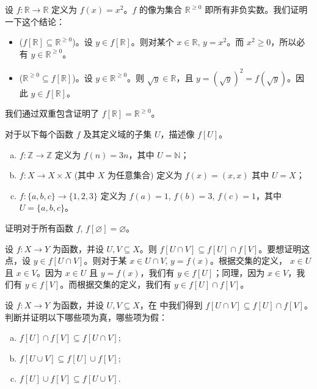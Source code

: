 \begin{example}
设 $f : \mathbb{R} \to \mathbb{R}$ 定义为 $f(x)=x^2$。$f$ 的像为集合 $\mathbb{R}^{\ge 0}$ 即所有非负实数。我们证明一下这个结论：
\begin{itemize}
\item ($f[\mathbb{R}] \subseteq \mathbb{R}^{\ge 0}$)。设 $y \in f[\mathbb{R}]$。则对某个 $x \in \mathbb{R}$, $y=x^2$。而 $x^2 \ge 0$，所以必有 $y \in \mathbb{R}^{\ge 0}$。
\item ($\mathbb{R}^{\ge 0} \subseteq f[\mathbb{R}]$)。设 $y \in \mathbb{R}^{\ge 0}$。则 $\sqrt{y} \in \mathbb{R}$，且 $y = (\sqrt{y})^2 = f(\sqrt{y})$。因此 $y \in f[\mathbb{R}]$。
\end{itemize}
我们通过双重包含证明了 $f[\mathbb{R}] = \mathbb{R}^{\ge 0}$。
\end{example}

\begin{exercise}
对于以下每个函数 $f$ 及其定义域的子集 $U$，描述像 $f[U]$。
\begin{enumerate}[(a)]
\item $f : \mathbb{Z} \to \mathbb{Z}$ 定义为 $f(n)=3n$，其中 $U = \mathbb{N}$；
\item $f : X \to X \times X$ (其中 $X$ 为任意集合) 定义为 $f(x)=(x,x)$ 其中 $U=X$；
\item $f : \{ a, b, c \} \to \{ 1, 2, 3 \}$ 定义为 $f(a)=1$, $f(b)=3$, $f(c)=1$，其中 $U=\{a,b,c\}$。
\end{enumerate}
\end{exercise}

\begin{exercise}
证明对于所有函数 $f$, $f[\varnothing] = \varnothing$。
\end{exercise}

\begin{example}
\label{exImageOfIntersectionSubsetIntersectionOfImage}
设 $f : X \to Y$ 为函数，并设 $U, V \subseteq X$。则 $f[U \cap V] \subseteq f[U] \cap f[V]$。要想证明这点，设 $y \in f[U \cap V]$。则对于某 $x \in U \cap V$, $y = f(x)$。根据交集的定义， $x \in U$ 且 $x \in V$。因为 $x \in U$ 且 $y=f(x)$，我们有 $y \in f[U]$；同理，因为 $x \in V$，我们有 $y \in f[V]$。而根据交集的定义，我们有 $y \in f[U] \cap f[V]$。
\end{example}

\begin{exercise}
设 $f : X \to Y$ 为函数，并设 $U, V \subseteq X$，在  中我们得到 $f[U \cap V] \subseteq f[U] \cap f[V]$。判断并证明以下哪些项为真，哪些项为假：
\begin{enumerate}[(a)]
\item $f[U] \cap f[V] \subseteq f[U \cap V]$;
\item $f[U \cup V] \subseteq f[U] \cup f[V]$;
\item $f[U] \cup f[V] \subseteq f[U \cup V]$.
\end{enumerate}
\end{exercise}

